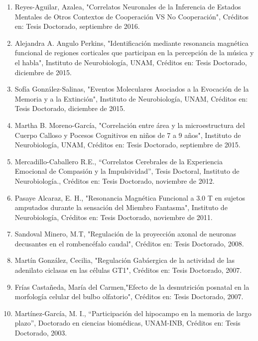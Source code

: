 \begin{enumerate}
\item Reyes-Aguilar, Azalea, "Correlatos Neuronales de la Inferencia de Estados Mentales de Otros Contextos de Cooperación 
VS 
No Cooperación", Créditos en: Tesis Doctorado, septiembre de 2016.

\item Alejandra A. Angulo Perkins, "Identificación mediante resonancia magnética funcional de regiones corticales que 
participan en la percepción de la música y el habla", Instituto de Neurobiología, UNAM, Créditos en: Tesis Doctorado, 
diciembre de 2015.

\item Sofía González-Salinas, "Eventos Moleculares Asociados a la Evocación de la Memoria y a la Extinción", Instituto de 
Neurobiología, UNAM, Créditos en: Tesis Doctorado, diciembre de 2015.

\item Martha B. Moreno-García, "Correlación entre área y la microestructura del Cuerpo Calloso y Pocesos Cognitivos en 
niños 
de 7 a 9 años", Instituto de Neurobiología, UNAM, Créditos en: Tesis Doctorado, septiembre de 2015.

\item Mercadillo-Caballero R.E., “Correlatos Cerebrales de la Experiencia Emocional de Compasión y la Impulsividad”, Tesis 
Doctoral, Instituto de Neurobiología., Créditos en: Tesis Doctorado, noviembre de 2012.

\item Pasaye Alcaraz, E. H., "Resonancia Magnética Funcional a 3.0 T en sujetos amputados durante la sensación del Miembro 
Fantasma", Instituto de Neurobiología, Créditos en: Tesis Doctorado, noviembre de 2011.

\item Sandoval Minero, M.T, "Regulación de la proyección axonal de neuronas decusantes en el rombencéfalo caudal", Créditos 
en: Tesis Doctorado, 2008.

\item Martín González, Cecilia, "Regulación Gabáergica de la actividad de las adenilato ciclasas en las células GT1", 
Créditos en: Tesis Doctorado, 2007.

\item Frías Castañeda, María del Carmen,"Efecto de la desnutrición posnatal en la morfología celular del bulbo olfatorio", 
Créditos en: Tesis Doctorado, 2007.

\item Martínez-García, M. I., “Participación del hipocampo en la memoria de largo plazo”, Doctorado en ciencias biomédicas, 
UNAM-INB, Créditos en: Tesis Doctorado, 2003.

\end{enumerate}
